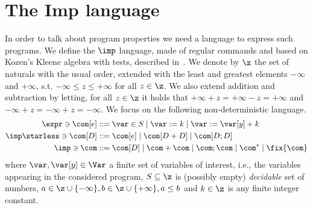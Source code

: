 \section{The Imp language}\label{sec:lang}

In order to talk about program properties we need a language to
express such programs. We define the \(\imp\) language, made of
regular commands and based on Kozen’s Kleene algebra with tests,
described in~\cite{kozen1997kleene}.  We denote by \(\z\) the set of
naturals with the usual order, extended with the least and greatest
elements \(-\infty\) and \(+\infty\), s.t.
\(-\infty \leq z \leq +\infty\) for all \(z \in \z\). We also extend
addition and subtraction by letting, for all \(z \in \z\) it holds
that \(+\infty + z = + \infty - z = + \infty\) and
\(-\infty + z = -\infty + z = -\infty\).  We focus on the following
non-deterministic language.
\begin{align*}
  \expr \ni \com[e] ::= & \; \var \in S  \mid \var := k \mid \var := \var[y] + k \\
  \imp\starless \ni \com[D] ::= & \; \com[e] \mid \com[D + D] \mid \com[D ; D] \\
  \imp \ni \com ::= & \; \com[D] \mid \com + \com \mid \com ; \com \mid \com^* \mid \fix{\com}
\end{align*}
where \(\var, \var[y] \in \Var\) a finite set of variables of
interest, i.e., the variables appearing in the considered program,
\(S\subseteq \z\) is (possibly empty) \emph{decidable} set of numbers,
\({a \in \z \cup \{-\infty\}}, {b \in \z \cup\{+\infty\}}, {a\leq b}\)
and \({k \in \z}\) is any finite integer constant.
